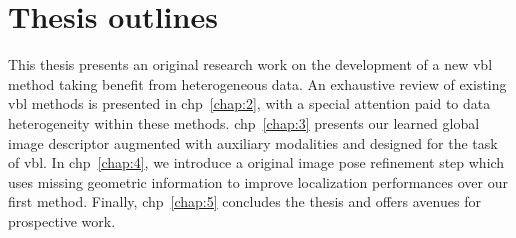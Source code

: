 \section{Thesis outlines}
This thesis presents an original research work on the development of a new \ac{vbl} method taking benefit from heterogeneous data. An exhaustive review of existing \ac{vbl} methods is presented in \acl{chp}~\ref{chap:2}, with a special attention paid to data heterogeneity within these methods. \Ac{chp}~\ref{chap:3} presents our learned global image descriptor augmented with auxiliary modalities and designed for the task of \ac{vbl}. In \acl{chp}~\ref{chap:4}, we introduce a original image pose refinement step which uses missing geometric information to improve localization performances over our first method. Finally, \ac{chp}~\ref{chap:5} concludes the thesis and offers avenues for prospective work.